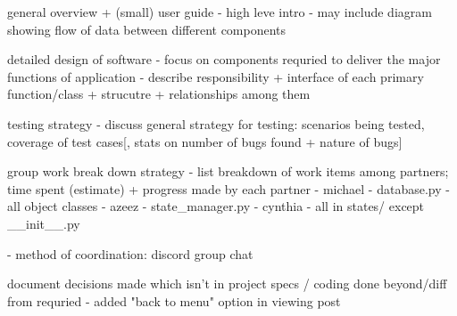 \documentclass{article}
\begin{document}
general overview + (small) user guide
- high leve intro
- may include diagram showing flow of data between different components

detailed design of software
- focus on components requried to deliver the major functions of application
- describe responsibility + interface of each primary function/class + strucutre + relationships among them

testing strategy
- discuss general strategy for testing: scenarios being tested, coverage of test cases[, stats on number of bugs found + nature of bugs]

group work break down strategy
- list breakdown of work items among partners; time spent (estimate) + progress made by each partner
- michael 
    - database.py
    - all object classes
- azeez
    - state_manager.py
- cynthia
    - all in states/ except __init__.py

- method of coordination: discord group chat


document decisions made which isn't in project specs / coding done beyond/diff from requried
- added "back to menu" option in viewing post
\end{document}
